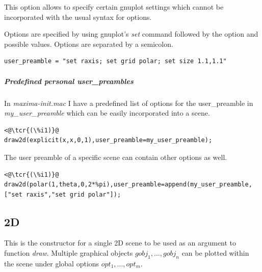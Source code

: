 \documentclass[../Maxima_Workbook.tex]{subfiles}
\begin{document}
\lz This option allows to specify certain gnuplot settings which cannot be incorporated with the usual syntax for options.

\lz {}

\lz Options are specified by using gnuplot's \emph{set} command followed by the option and possible values. Options are separated by a semicolon.

\lz \begin{lstlisting}
user_preamble = "set raxis; set grid polar; set size 1.1,1.1"
\end{lstlisting}

\subparagraph{Predefined personal user\_preambles} \mbox{}

\lz In \emph{maxima-init.mac} I have a predefined list of options for the user\_preamble in \emph{my\_user\_preamble} which can be easily incorporated into a scene.

\lz \begin{lstlisting}
<@\tcr{(\%i1)}@   draw2d(explicit(x,x,0,1),user_preamble=my_user_preamble);
\end{lstlisting}

\lz The user preamble of a specific scene can contain other options as well.

\lz \begin{lstlisting}
<@\tcr{(\%i1)}@   draw2d(polar(1,theta,0,2*%pi),user_preamble=append(my_user_preamble,["set raxis","set grid polar"]);
\end{lstlisting}

\subsection{2D}

\lz {} \hfill {}

\lz This is the constructor for a single 2D scene to be used as an argument to function \emph{draw}. Multiple graphical objects $ gobj_1,\dots,gobj_n $ can be plotted within the scene under global options $ opt_1,\dots,opt_m $.

\lzz {} \hfill \tcr{[function]}

 \hfill \tcr{[function]}
\end{document}

